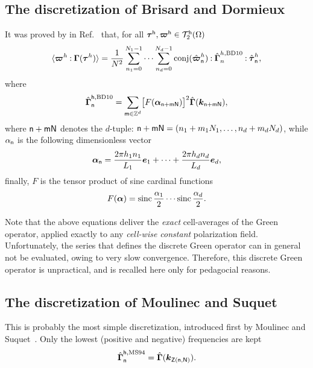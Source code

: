 \subsection{The discretization of Brisard and Dormieux}

It was proved by in Ref.~\cite{bris2010a} that, for all
\(\boldsymbol\tau^{\mathsf h}, \boldsymbol\varpi^{\mathsf h}\in\mathcal T_2^{\mathsf h}(\Omega)\)
\begin{equation}
  \langle\boldsymbol\varpi^h\mathbin{\mathord{:}}\boldsymbol\Gamma(\boldsymbol\tau^h)\rangle=\frac1{N^2}
  \sum_{n_1=0}^{N_1-1}\cdots\sum_{n_d=0}^{N_d-1}\operatorname{conj}(\hat{\boldsymbol\varpi}_
  {\mathsf{n}}^h)\mathbin{\mathord{:}}\hat{\boldsymbol\Gamma}_n^{h, \mathrm{BD10}}\mathbin{\mathord{:}}
  \hat{\boldsymbol\tau}_{\mathsf{n}}^h,
\end{equation}
where
\begin{equation}
  \hat{\boldsymbol\Gamma}_{\mathsf n}^{\mathsf h, \mathrm{BD10}}
  =\sum_{\mathsf m\in\mathbb Z^d}\bigl[F(\boldsymbol\alpha_{\mathsf n+\mathsf m\mathsf N})
  \bigr]^2\hat{\boldsymbol\Gamma}(\boldsymbol k_{\mathsf n+\mathsf m\mathsf N}),
\end{equation}
where \(\mathsf{n+mN}\) denotes the \(d\)-tuple:
\(\mathsf n+\mathsf m\mathsf N=(n_1+m_1N_1, \ldots, n_d+m_dN_d)\), while
\(\alpha_{\mathsf{n}}\) is the following dimensionless vector
\begin{equation}
  \boldsymbol\alpha_{\mathsf{n}}
  =\frac{2\pi h_1n_1}{L_1}\boldsymbol e_1+\cdots+\frac{2\pi h_dn_d}{L_d}\boldsymbol e_d,
\end{equation}
finally, \(F\) is the tensor product of sine cardinal functions
\begin{equation}
  F(\boldsymbol\alpha)=\operatorname{sinc}\frac{\alpha_1}2\cdots\operatorname{sinc}\frac{\alpha_d}2.
\end{equation}

Note that the above equations deliver the \emph{exact} cell-averages of the
Green operator, applied exactly to any \emph{cell-wise constant} polarization
field. Unfortunately, the series that defines the discrete Green operator can in
general not be evaluated, owing to very slow convergence. Therefore, this
discrete Green operator is unpractical, and is recalled here only for pedagocial
reasons.

\subsection{The discretization of Moulinec and Suquet}

This is probably the most simple discretization, introduced first by Moulinec
and Suquet~\cite{moul1994, moul1998}. Only the lowest (positive and negative)
frequencies are kept
\begin{equation}
  \hat{\boldsymbol\Gamma}_{\mathsf n}^{\mathsf h, \mathrm{MS94}}=\hat{\boldsymbol\Gamma}
  (\boldsymbol k_{\mathsf Z(\mathsf n, \mathsf N)}).
\end{equation}

